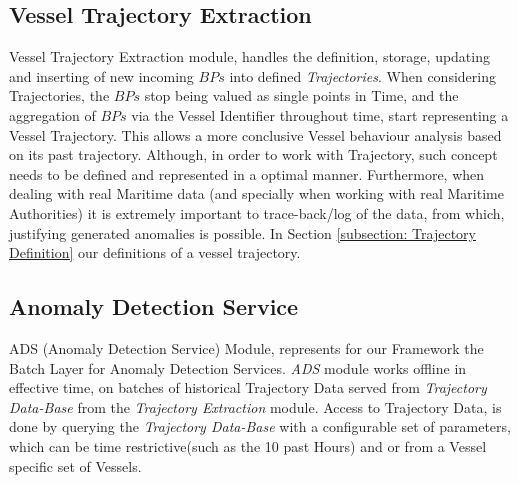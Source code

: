 
\subsection{Vessel Trajectory Extraction}
\label{subsection: 3 Vessel Trajectory Extraction}

Vessel Trajectory Extraction module, handles the definition, storage,  updating and inserting of new incoming $BPs$ into defined \emph{Trajectories}.
When considering Trajectories, the $BPs$ stop being valued as single points in Time, and the aggregation of $BPs$ via the Vessel Identifier throughout time, start representing a Vessel Trajectory. This allows a more conclusive Vessel behaviour analysis based on its past trajectory. Although, in order to work with Trajectory, such concept needs to be defined and represented in a optimal manner. Furthermore, when dealing with real Maritime data (and specially when working with real Maritime Authorities) it is extremely important to trace-back/log of the data, from which, justifying generated anomalies is possible. 
In Section \ref{subsection: Trajectory Definition} our definitions of a vessel trajectory. 


\subsection{Anomaly Detection Service}
\label{subsection: 3 ADS}
ADS (Anomaly Detection Service) Module, represents for our Framework the Batch Layer for Anomaly Detection Services. \emph{ADS} module works offline in effective time, on batches of historical Trajectory Data served from \emph{Trajectory Data-Base} from the \emph{Trajectory Extraction} module. Access to Trajectory Data, is done by querying the \emph{Trajectory Data-Base} with a configurable set of parameters, which can be time restrictive(such as the 10 past Hours) and or from a Vessel specific set of Vessels. 

